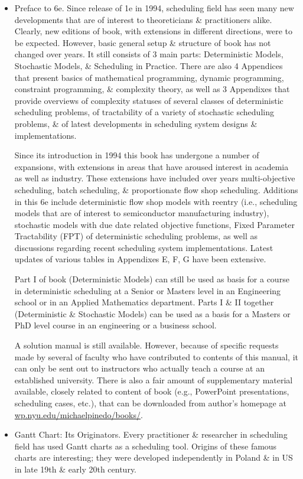 \documentclass{article}
\begin{document}
\begin{itemize}
    \item {\sf Preface to 6e.} Since release of 1e in 1994, scheduling field has seen many new developments that are of interest to theoreticians \& practitioners alike. Clearly, new editions of book, with extensions in different directions, were to be expected. However, basic general setup \& structure of book has not changed over years. It still consists of 3 main parts: Deterministic Models, Stochastic Models, \& Scheduling in Practice. There are also 4 Appendices that present basics of mathematical programming, dynamic programming, constraint programming, \& complexity theory, as well as 3 Appendixes that provide overviews of complexity statuses of several classes of deterministic scheduling problems, of tractability of a variety of stochastic scheduling problems, \& of latest developments in scheduling system designs \& implementations.

    Since its introduction in 1994 this book has undergone a number of expansions, with extensions in areas that have aroused interest in academia as well as industry. These extensions have included over years multi-objective scheduling, batch scheduling, \& proportionate flow shop scheduling. Additions in this 6e include deterministic flow shop models with reentry (i.e., scheduling models that are of interest to semiconductor manufacturing industry), stochastic models with due date related objective functions, Fixed Parameter Tractability (FPT) of deterministic scheduling problems, as well as discussions regarding recent scheduling system implementations. Latest updates of various tables in Appendixes E, F, G have been extensive.

    Part I of book (Deterministic Models) can still be used as basis for a course in deterministic scheduling at a Senior or Masters level in an Engineering school or in an Applied Mathematics department. Parts I \& II together (Deterministic \& Stochastic Models) can be used as a basis for a Masters or PhD level course in an engineering or a business school.

    A solution manual is still available. However, because of specific requests made by several of faculty who have contributed to contents of this manual, it can only be sent out to instructors who actually teach a course at an established university. There is also a fair amount of supplementary material available, closely related to content of book (e.g., PowerPoint presentations, scheduling cases, etc.), that can be downloaded from author's homepage at \url{wp.nyu.edu/michaelpinedo/books/}.
    \item {\sf Gantt Chart: Its Originators.} Every practitioner \& researcher in scheduling field has used Gantt charts as a scheduling tool. Origins of these famous charts are interesting; they were developed independently in Poland \& in US in late 19th \& early 20th century.


\end{itemize}
\end{document}
